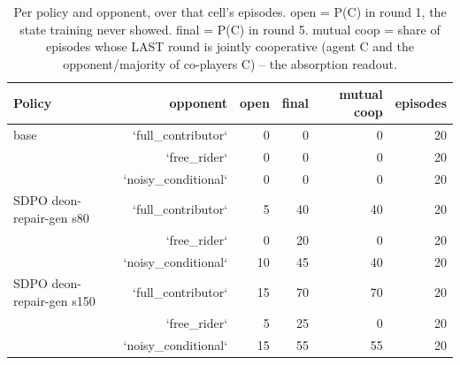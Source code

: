 \begin{table}[t]
\centering
\caption{Per policy and opponent, over that cell's episodes. open = P(C) in round 1, the state training never showed. final = P(C) in round 5. mutual coop = share of episodes whose LAST round is jointly cooperative (agent C and the opponent/majority of co-players C) -- the absorption readout.}
\label{tab:mr-outcomes}
\small
\setlength{\tabcolsep}{3.5pt}
\begin{tabular}{lrrrrr}
\toprule
Policy & opponent & open & final & mutual coop & episodes \\
\midrule
base & `full_contributor` & 0 & 0 & 0 & 20 \\
 & `free_rider` & 0 & 0 & 0 & 20 \\
 & `noisy_conditional` & 0 & 0 & 0 & 20 \\
SDPO deon-repair-gen s80 & `full_contributor` & 5 & 40 & 40 & 20 \\
 & `free_rider` & 0 & 20 & 0 & 20 \\
 & `noisy_conditional` & 10 & 45 & 40 & 20 \\
SDPO deon-repair-gen s150 & `full_contributor` & 15 & 70 & 70 & 20 \\
 & `free_rider` & 5 & 25 & 0 & 20 \\
 & `noisy_conditional` & 15 & 55 & 55 & 20 \\
\bottomrule
\end{tabular}
\end{table}
